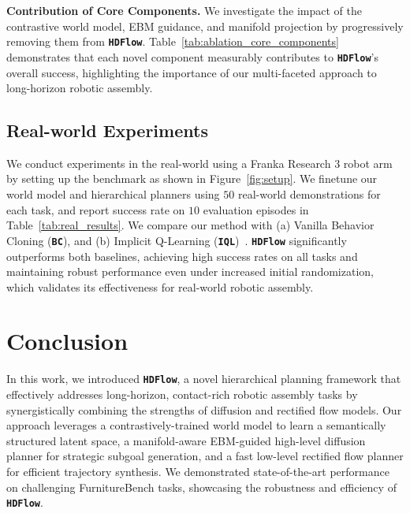 \documentclass{article} %
\begin{document}


\textbf{Contribution of Core Components.}
We investigate the impact of the contrastive world model, EBM guidance, and manifold projection by progressively removing them from \texttt{\textbf{HDFlow}}. Table~\ref{tab:ablation_core_components} demonstrates that each novel component measurably contributes to \texttt{\textbf{HDFlow}}'s overall success, highlighting the importance of our multi-faceted approach to long-horizon robotic assembly.

\subsection{Real-world Experiments}
\vspace{-5pt}
We conduct experiments in the real-world using a Franka Research 3 robot arm by setting up the benchmark as shown in Figure~\ref{fig:setup}. We finetune our world model and hierarchical planners using $50$ real-world demonstrations for each task, and report success rate on $10$ evaluation episodes in Table~\ref{tab:real_results}. We compare our method with (a) Vanilla Behavior Cloning (\texttt{\textbf{BC}}), and (b) Implicit Q-Learning (\texttt{\textbf{IQL}})~\citep{kostrikov2022offline}. \texttt{\textbf{HDFlow}} significantly outperforms both baselines, achieving high success rates on all tasks and maintaining robust performance even under increased initial randomization, which validates its effectiveness for real-world robotic assembly.

\section{Conclusion}
\vspace{-8pt}
In this work, we introduced \texttt{\textbf{HDFlow}}, a novel hierarchical planning framework that effectively addresses long-horizon, contact-rich robotic assembly tasks by synergistically combining the strengths of diffusion and rectified flow models. Our approach leverages a contrastively-trained world model to learn a semantically structured latent space, a manifold-aware EBM-guided high-level diffusion planner for strategic subgoal generation, and a fast low-level rectified flow planner for efficient trajectory synthesis. We demonstrated state-of-the-art performance on challenging FurnitureBench tasks, showcasing the robustness and efficiency of \texttt{\textbf{HDFlow}}.
\end{document}
